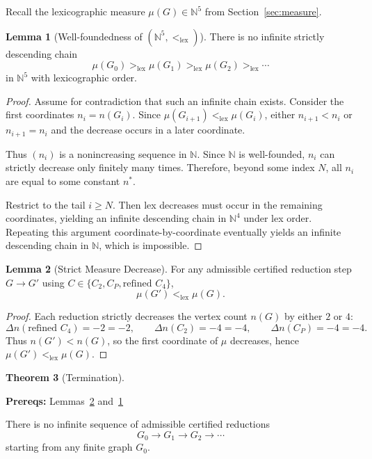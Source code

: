 \documentclass[12pt]{article}
\theoremstyle{definition}
\newtheorem{theorem}{Theorem}
\newtheorem{lemma}[theorem]{Lemma}
\newcommand{\prereq}[1]{\par\noindent\textbf{Prereqs:} #1\par}
\newcommand{\CtwoDelta}{-4}
\newcommand{\RefinedCfourDelta}{-2}
\newcommand{\PinchIIGadgetDelta}{-4}
\begin{document}
Recall the lexicographic measure $\mu(G) \in \mathbb{N}^5$ from Section~\ref{sec:measure}.

\begin{lemma}[Well-foundedness of $(\mathbb{N}^5, <_{\text{lex}})$]
\label{lem:well-founded}
There is no infinite strictly descending chain
\[
\mu(G_0) >_{\text{lex}} \mu(G_1) >_{\text{lex}} \mu(G_2) >_{\text{lex}} \cdots
\]
in $\mathbb{N}^5$ with lexicographic order.
\end{lemma}

\begin{proof}
Assume for contradiction that such an infinite chain exists. Consider the first coordinates $n_i = n(G_i)$. Since $\mu(G_{i+1}) <_{\text{lex}} \mu(G_i)$, either $n_{i+1} < n_i$ or $n_{i+1} = n_i$ and the decrease occurs in a later coordinate.

Thus $(n_i)$ is a nonincreasing sequence in $\mathbb{N}$. Since $\mathbb{N}$ is well-founded, $n_i$ can strictly decrease only finitely many times. Therefore, beyond some index $N$, all $n_i$ are equal to some constant $n^*$.

Restrict to the tail $i \ge N$. Then lex decreases must occur in the remaining coordinates, yielding an infinite descending chain in $\mathbb{N}^4$ under lex order. Repeating this argument coordinate-by-coordinate eventually yields an infinite descending chain in $\mathbb{N}$, which is impossible.
\end{proof}

\begin{lemma}[Strict Measure Decrease]
\label{lem:measure-decrease}
For any admissible certified reduction step $G \to G'$ using $C \in \{C_2, C_P, \text{refined } C_4\}$,
\[
\mu(G') <_{\text{lex}} \mu(G).
\]
\end{lemma}

\begin{proof}
Each reduction strictly decreases the vertex count $n(G)$ by either $2$ or $4$:
\[
\Delta n(\text{refined } C_4)=\RefinedCfourDelta=-2,\qquad
\Delta n(C_2)=\CtwoDelta=-4,\qquad
\Delta n(C_P)=\PinchIIGadgetDelta=-4.
\]
Thus $n(G')<n(G)$, so the first coordinate of $\mu$ decreases, hence $\mu(G')<_{\text{lex}}\mu(G)$.
\end{proof}

\begin{theorem}[Termination]
\label{thm:termination}
\prereq{Lemmas~\ref{lem:measure-decrease} and~\ref{lem:well-founded}}
There is no infinite sequence of admissible certified reductions
\[
G_0 \to G_1 \to G_2 \to \cdots
\]
starting from any finite graph $G_0$.
\end{theorem}
\end{document}
